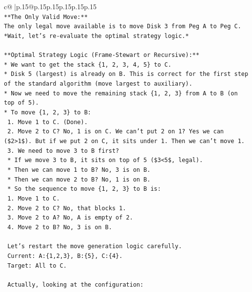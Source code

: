 \documentclass{article}
\begin{document}
{\begin{supertabular}{c@{$\;$}|p{.15\linewidth}@{}p{.15\linewidth}p{.15\linewidth}p{.15\linewidth}p{.15\linewidth}p{.15\linewidth}}
{{{\\ 
\texttt{**The Only Valid Move:**} \\
\texttt{The only legal move available is to move Disk 3 from Peg A to Peg C.} \\
\texttt{*Wait, let's re{-}evaluate the optimal strategy logic.*} \\
\\ 
\texttt{**Optimal Strategy Logic (Frame{-}Stewart or Recursive):**} \\
\texttt{*   We want to get the stack \{1, 2, 3, 4, 5\} to C.} \\
\texttt{*   Disk 5 (largest) is already on B. This is correct for the first step of the standard algorithm (move largest to auxiliary).} \\
\texttt{*   Now we need to move the remaining stack \{1, 2, 3\} from A to B (on top of 5).} \\
\texttt{*   To move \{1, 2, 3\} to B:} \\
\texttt{    1.  Move 1 to C. (Done).} \\
\texttt{    2.  Move 2 to C? No, 1 is on C. We can't put 2 on 1? Yes we can (\$2>1\$). But if we put 2 on C, it sits under 1. Then we can't move 1.} \\
\texttt{    3.  We need to move 3 to B first?} \\
\texttt{        *   If we move 3 to B, it sits on top of 5 (\$3<5\$, legal).} \\
\texttt{        *   Then we can move 1 to B? No, 3 is on B.} \\
\texttt{        *   Then we can move 2 to B? No, 1 is on B.} \\
\texttt{    *   So the sequence to move \{1, 2, 3\} to B is:} \\
\texttt{        1.  Move 1 to C.} \\
\texttt{        2.  Move 2 to C? No, that blocks 1.} \\
\texttt{        3.  Move 2 to A? No, A is empty of 2.} \\
\texttt{        4.  Move 2 to B? No, 3 is on B.} \\
\\ 
\texttt{    Let's restart the move generation logic carefully.} \\
\texttt{    Current: A:\{1,2,3\}, B:\{5\}, C:\{4\}.} \\
\texttt{    Target: All to C.} \\
\\ 
\texttt{    Actually, looking at the configuration:} \\
}}}
\end{supertabular}}
\end{document}
